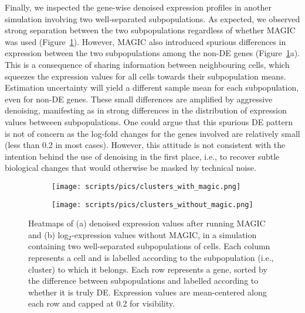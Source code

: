 \documentclass[10pt,letterpaper]{article}
\begin{document}
Finally, we inspected the gene-wise denoised expression profiles in another simulation involving two well-separated subpopulations.
As expected, we observed strong separation between the two subpopulations regardless of whether MAGIC was used (Figure~\ref{fig:twoclusters}).
However, MAGIC also introduced spurious differences in expression between the two subpopulations among the non-DE genes (Figure~\ref{fig:twoclusters}a).
This is a consequence of sharing information between neighbouring cells, which squeezes the expression values for all cells towards their subpopulation means.
Estimation uncertainty will yield a different sample mean for each subpopulation, even for non-DE genes.
These small differences are amplified by aggressive denoising, manifesting as in strong differences in the distribution of expression values betweeen subpopulations.
One could argue that this spurious DE pattern is not of concern as the log-fold changes for the genes involved are relatively small (less than 0.2 in most cases).
However, this attitude is not consistent with the intention behind the use of denoising in the first place, 
i.e., to recover subtle biological changes that would otherwise be masked by technical noise.

\begin{figure}[btp]
\centering
\begin{subfigure}[b]{0.49\textwidth}
    \texttt{[image: scripts/pics/clusters\_with\_magic.png]}
    \caption{}
\end{subfigure}
\begin{subfigure}[b]{0.49\textwidth}
    \texttt{[image: scripts/pics/clusters\_without\_magic.png]}
    \caption{}
\end{subfigure}
\caption{Heatmaps of (a) denoised expression values after running MAGIC and (b) log$_2$-expression values without MAGIC, 
in a simulation containing two well-separated subpopulations of cells.
Each column represents a cell and is labelled according to the subpopulation (i.e., cluster) to which it belongs.
Each row represents a gene, sorted by the difference between subpopulations and labelled according to whether it is truly DE.
Expression values are mean-centered along each row and capped at 0.2 for visibility.}
\label{fig:twoclusters}
\end{figure}
\end{document}

